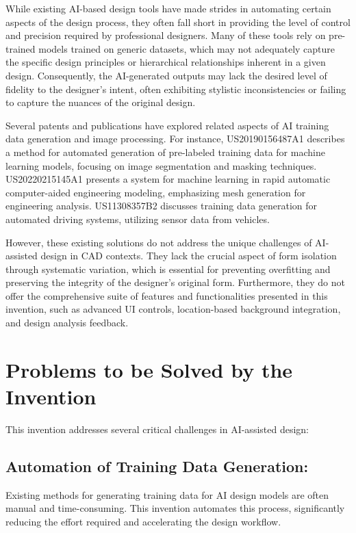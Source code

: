 \documentclass{article}
\begin{document}
While existing AI-based design tools have made strides in automating certain aspects of the design process, they often fall short in providing the level of control and precision required by professional designers. Many of these tools rely on pre-trained models trained on generic datasets, which may not adequately capture the specific design principles or hierarchical relationships inherent in a given design. Consequently, the AI-generated outputs may lack the desired level of fidelity to the designer's intent, often exhibiting stylistic inconsistencies or failing to capture the nuances of the original design.

Several patents and publications have explored related aspects of AI training data generation and image processing. For instance, US20190156487A1 describes a method for automated generation of pre-labeled training data for machine learning models, focusing on image segmentation and masking techniques. US20220215145A1 presents a system for machine learning in rapid automatic computer-aided engineering modeling, emphasizing mesh generation for engineering analysis. US11308357B2 discusses training data generation for automated driving systems, utilizing sensor data from vehicles.

However, these existing solutions do not address the unique challenges of AI-assisted design in CAD contexts. They lack the crucial aspect of form isolation through systematic variation, which is essential for preventing overfitting and preserving the integrity of the designer's original form. Furthermore, they do not offer the comprehensive suite of features and functionalities presented in this invention, such as advanced UI controls, location-based background integration, and design analysis feedback.

\section{Problems to be Solved by the Invention}

This invention addresses several critical challenges in AI-assisted design:

\subsection{Automation of Training Data Generation:}
Existing methods for generating training data for AI design models are often manual and time-consuming. This invention automates this process, significantly reducing the effort required and accelerating the design workflow.
\end{document}
